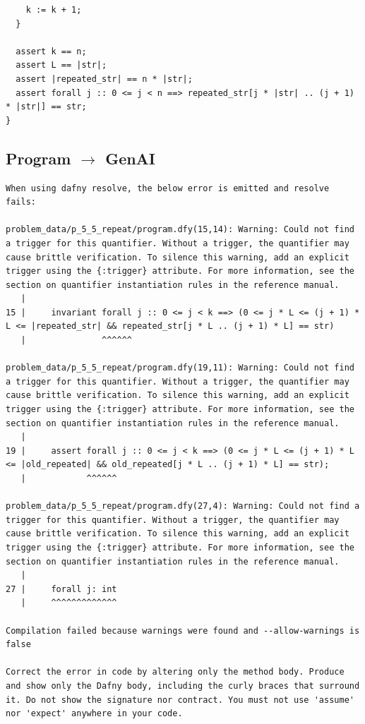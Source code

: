 \documentclass{article}
\begin{document}
\begin{lstlisting}
    k := k + 1;
  }

  assert k == n;
  assert L == |str|;
  assert |repeated_str| == n * |str|;
  assert forall j :: 0 <= j < n ==> repeated_str[j * |str| .. (j + 1) * |str|] == str;
}
\end{lstlisting}
\subsection*{Program $\rightarrow$ GenAI}
\begin{lstlisting}
When using dafny resolve, the below error is emitted and resolve fails:

problem_data/p_5_5_repeat/program.dfy(15,14): Warning: Could not find a trigger for this quantifier. Without a trigger, the quantifier may cause brittle verification. To silence this warning, add an explicit trigger using the {:trigger} attribute. For more information, see the section on quantifier instantiation rules in the reference manual.
   |
15 |     invariant forall j :: 0 <= j < k ==> (0 <= j * L <= (j + 1) * L <= |repeated_str| && repeated_str[j * L .. (j + 1) * L] == str)
   |               ^^^^^^

problem_data/p_5_5_repeat/program.dfy(19,11): Warning: Could not find a trigger for this quantifier. Without a trigger, the quantifier may cause brittle verification. To silence this warning, add an explicit trigger using the {:trigger} attribute. For more information, see the section on quantifier instantiation rules in the reference manual.
   |
19 |     assert forall j :: 0 <= j < k ==> (0 <= j * L <= (j + 1) * L <= |old_repeated| && old_repeated[j * L .. (j + 1) * L] == str);
   |            ^^^^^^

problem_data/p_5_5_repeat/program.dfy(27,4): Warning: Could not find a trigger for this quantifier. Without a trigger, the quantifier may cause brittle verification. To silence this warning, add an explicit trigger using the {:trigger} attribute. For more information, see the section on quantifier instantiation rules in the reference manual.
   |
27 |     forall j: int
   |     ^^^^^^^^^^^^^

Compilation failed because warnings were found and --allow-warnings is false

Correct the error in code by altering only the method body. Produce and show only the Dafny body, including the curly braces that surround it. Do not show the signature nor contract. You must not use 'assume' nor 'expect' anywhere in your code.
\end{lstlisting}
\end{document}
